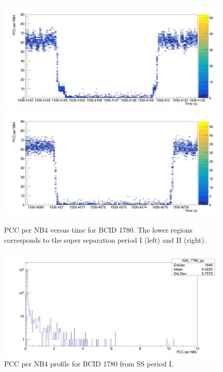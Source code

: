 \begin{center}
\begin{figure}[ht]
\centering
\includegraphics[width=.49\textwidth]{Chapter4/plots/SS1_WIDE_BX1780.png}
\includegraphics[width=.49\textwidth]{Chapter4/plots/SS2_WIDE_BX1780.png}
\caption[Super Separation periods for BCID 1780]{PCC per NB4 versus time for BCID 1780. The lower regions corresponds to the super separation period I (left) and II (right).}
\label{ssp_wide_bx1780}
\end{figure}
\end{center}


\begin{center}
  \begin{figure}[ht]
    \centering
    \includegraphics[scale=.18]{Chapter4/plots/ss1_histo_bx1780.png}
    \caption[PCC per NB4 profile for BCID 1780 from SS period I]{ PCC per NB4 profile for BCID 1780 from SS period I.} 
    \label{ss1_hist_1780}
  \end{figure}
\end{center}


